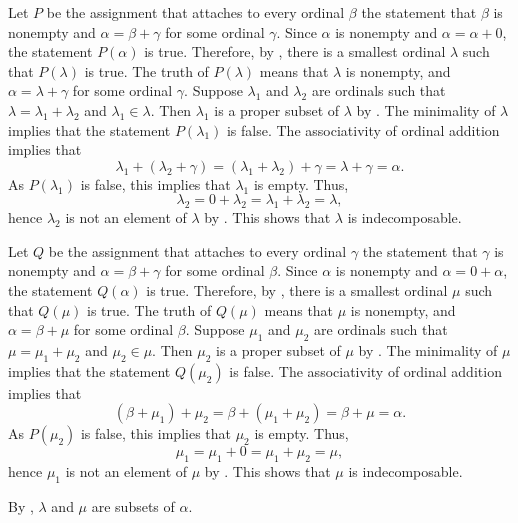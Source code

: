 \documentclass{article}
\begin{document}
\begin{solution}[\ref{exe:vmlhobjb}]
  \label{sol:cec8sl16}
  Let \(P\) be the assignment that attaches to every ordinal \(\beta\)
  the statement that \(\beta\) is nonempty and
  \(\alpha = \beta + \gamma\) for some ordinal \(\gamma\).  Since
  \(\alpha\) is nonempty and \(\alpha = \alpha + 0\), the statement
  \(P(\alpha)\) is true.  Therefore, by , there is
  a smallest ordinal \(\lambda\) such that \(P(\lambda)\) is true.
  The truth of \(P(\lambda)\) means that \(\lambda\) is nonempty, and
  \(\alpha = \lambda + \gamma\) for some ordinal \(\gamma\).
  Suppose \(\lambda_1\) and \(\lambda_2\) are ordinals such that
  \(\lambda = \lambda_1 + \lambda_2\) and \(\lambda_1 \in \lambda\).
  Then \(\lambda_1\) is a proper subset of \(\lambda\) by
  .  The minimality of \(\lambda\) implies that the
  statement \(P(\lambda_1)\) is false.  The associativity of ordinal
  addition implies that
  \begin{displaymath}
    \lambda_1 + (\lambda_2 + \gamma) =
    (\lambda_1 + \lambda_2) + \gamma =
    \lambda + \gamma = \alpha.
  \end{displaymath}
  As \(P(\lambda_1)\) is false, this implies that \(\lambda_1\) is
  empty.  Thus,
  \begin{displaymath}
    \lambda_2 = 0 + \lambda_2 = \lambda_1 + \lambda_2 = \lambda,
  \end{displaymath}
  hence \(\lambda_2\) is not an element of \(\lambda\) by
  .  This shows that \(\lambda\) is indecomposable.
  
  Let \(Q\) be the assignment that attaches to every ordinal
  \(\gamma\) the statement that \(\gamma\) is nonempty and
  \(\alpha = \beta + \gamma\) for some ordinal \(\beta\).  Since
  \(\alpha\) is nonempty and \(\alpha = 0 + \alpha\), the statement
  \(Q(\alpha)\) is true.  Therefore, by , there is
  a smallest ordinal \(\mu\) such that \(Q(\mu)\) is true.  The truth
  of \(Q(\mu)\) means that \(\mu\) is nonempty, and
  \(\alpha = \beta + \mu\) for some ordinal \(\beta\).  Suppose
  \(\mu_1\) and \(\mu_2\) are ordinals such that
  \(\mu = \mu_1 + \mu_2\) and \(\mu_2 \in \mu\).  Then \(\mu_2\) is a
  proper subset of \(\mu\) by .  The minimality of
  \(\mu\) implies that the statement \(Q(\mu_2)\) is false.  The
  associativity of ordinal addition implies that
  \begin{displaymath}
    (\beta + \mu_1) + \mu_2 =
    \beta + (\mu_1 + \mu_2) =
    \beta + \mu = \alpha.
  \end{displaymath}
  As \(P(\mu_2)\) is false, this implies that \(\mu_2\) is empty.
  Thus,
  \begin{displaymath}
    \mu_1 = \mu_1 + 0 = \mu_1 + \mu_2 = \mu,
  \end{displaymath}
  hence \(\mu_1\) is not an element of \(\mu\) by .
  This shows that \(\mu\) is indecomposable.

  By , \(\lambda\) and \(\mu\) are subsets of
  \(\alpha\).
\end{solution}
\end{document}
